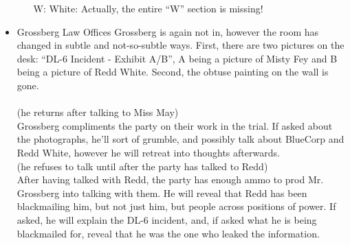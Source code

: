 \begin{itemize}
\begin{itemize}
\item[W:] White:
Actually, the entire ``W'' section is missing!
\end{itemize}
\item Grossberg Law Offices
Grossberg is again not in, however the room has changed in subtle and not-so-subtle ways. First, there are two pictures on the desk: ``DL-6 Incident - Exhibit A/B'', A being a picture of Misty Fey and B being a picture of Redd White. Second, the obtuse painting on the wall is gone.\\
\\
(he returns after talking to Miss May)\\
Grossberg compliments the party on their work in the trial. If asked about the photographs, he'll sort of grumble, and possibly talk about BlueCorp and Redd White, however he will retreat into thoughts afterwards.\\
(he refuses to talk until after the party has talked to Redd)\\
After having talked with Redd, the party has enough ammo to prod Mr. Grossberg into talking with them. He will reveal that Redd has been blackmailing him, but not just him, but people across positions of power. If asked, he will explain the DL-6 incident, and, if asked what he is being blackmailed for, reveal that he was the one who leaked the information.


\end{itemize}